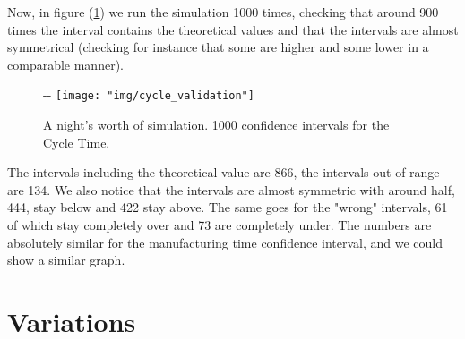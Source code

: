 \documentclass[paper=a4, fontsize=11pt]{scrartcl}
\numberwithin{equation}{section}		%
\numberwithin{figure}{section}			%
\numberwithin{table}{section}				%
\begin{document}
Now, in figure (\ref{fig:cycle_validation}) we run the simulation 1000 times, checking that around 900 times the interval contains the theoretical values and that the intervals are almost symmetrical (checking for instance that some are higher and some lower in a comparable manner).
\begin{figure}
	\begin{adjustwidth}{-\oddsidemargin-0.5in}{-\rightmargin}
     		\centering
		\texttt{[image: "img/cycle\_validation"]}
		\label{fig:cycle_validation}
		\caption{A night's worth of simulation. 1000 confidence intervals for the Cycle Time.}
		\end{adjustwidth}
\end{figure}
The intervals including the theoretical value are 866, the intervals out of range are 134. We also notice that the intervals are almost symmetric with around half, 444, stay below and 422 stay above. The same goes for the "wrong" intervals, 61 of which stay completely over and 73 are completely under.
The numbers are absolutely similar for the manufacturing time confidence interval, and we could show a similar graph.

\section{Variations}










\end{document}
